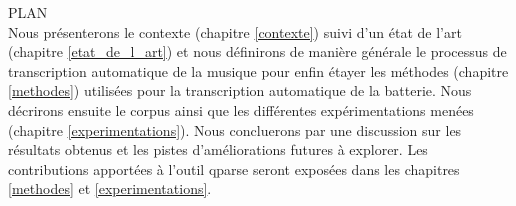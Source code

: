 % 
PLAN\\
Nous présenterons le contexte (chapitre \ref{contexte}) suivi d’un état de l’art
(chapitre \ref{etat_de_l_art}) et nous définirons de manière générale le
processus de transcription automatique de la musique pour enfin étayer les
méthodes (chapitre \ref{methodes}) utilisées pour la transcription automatique
de la batterie.  Nous décrirons ensuite le corpus ainsi que les différentes
expérimentations menées (chapitre \ref{experimentations}). Nous concluerons par
une discussion sur les résultats obtenus et les pistes d’améliorations futures
à explorer. Les contributions apportées à l’outil qparse seront exposées dans
les chapitres \ref{methodes} et \ref{experimentations}.
